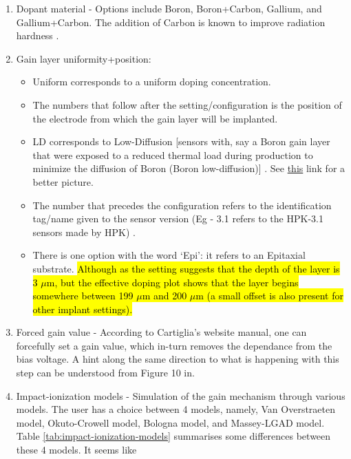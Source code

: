 \documentclass[11pt]{article}
\newcommand{\hlyellow}[1]{{\sethlcolor{yellow}\hl{#1}}}
\begin{document}
\begin{enumerate}
    \item Dopant material - Options include Boron, Boron+Carbon, Gallium, and Gallium+Carbon. The addition of Carbon is known to improve radiation hardness \cite{ferrero-radiation-hardness}.
    \item Gain layer uniformity+position: 
        \begin{itemize}
            \item Uniform corresponds to a uniform doping concentration. 
            \item The numbers that follow after the setting/configuration is the position of the electrode from which the gain layer will be implanted. 
            \item LD corresponds to Low-Diffusion [sensors with, say a Boron gain layer that were exposed to a reduced thermal load during production to minimize the diffusion of Boron (Boron low-diffusion)] \cite{ferrero-radiation-hardness}. See \href{https://indico.cern.ch/event/806731/contributions/3516709/attachments/1926118/3188326/191013-VERTEX-RD50-mmoll-acceptor-removal.pdf}{this} link for a better picture.
            \item The number that precedes the configuration refers to the identification tag/name given to the sensor version (Eg - 3.1 refers to the HPK-3.1 sensors made by HPK) \cite{jadhav-sensor-variation, jin-sensor-variation}.
            \item There is one option with the word `Epi': it refers to an Epitaxial substrate. \hlyellow{Although as the setting suggests that the depth of the layer is 3 $\mu$m, but the effective doping plot shows that the layer begins somewhere between 199 $\mu$m and 200 $\mu$m (a small offset is also present for other implant settings).}
        \end{itemize}
    \item Forced gain value - According to Cartiglia's website manual, one can forcefully set a gain value, which in-turn removes the dependance from the bias voltage. A hint along the same direction to what is happening with this step can be understood from Figure 10 in\cite{ferrero-radiation-hardness}.
    \item Impact-ionization models - Simulation of the gain mechanism through various models. The user has a choice between 4 models, namely, Van Overstraeten model, Okuto-Crowell model, Bologna model, and Massey-LGAD model. Table \ref{tab:impact-ionization-models} summarises some differences between these 4 models. It seems like 
\end{enumerate}
\end{document}
